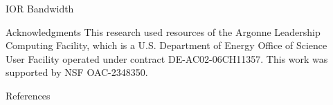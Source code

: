 \documentclass[final]{beamer}
\newlength{\sepwidth}
\newlength{\colwidth}
\newcommand{\separatorcolumn}{\begin{column}{\sepwidth}\end{column}}
\begin{document}
\begin{frame}[t, fragile]
\begin{columns}[t]
\begin{column}{\colwidth}
\begin{block}{IOR Bandwidth}
 
  \end{block}

    \begin{block}{Acknowledgments}
  This research used resources of the Argonne Leadership Computing Facility, 
  which is a U.S. Department of Energy Office of Science User Facility 
  operated under contract DE-AC02-06CH11357. This work was supported by NSF OAC-2348350.
  \end{block}
  

  \begin{block}{References} 

    \nocite{*}
    \footnotesize{}
 
  \end{block}

\end{column}

\separatorcolumn
\end{columns}
\end{frame}
\end{document}
